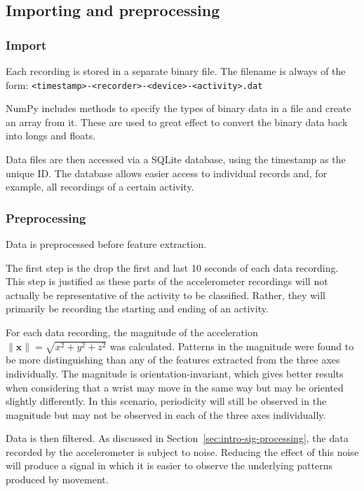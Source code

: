     \subsection{Importing and preprocessing}
      \subsubsection{Import}
        Each recording is stored in a separate binary file. The filename is always of the form: \texttt{<timestamp>-<recorder>-<device>-<activity>.dat}
        
        NumPy includes methods to specify the types of binary data in a file and create an array from it. These are used to great effect to convert the binary data back into longs and floats.
        
        Data files are then accessed via a SQLite database, using the timestamp as the unique ID. The database allows easier access to individual records and, for example, all recordings of a certain activity.
      \subsubsection{Preprocessing}
        \label{sec:preprocessing}
        Data is preprocessed before feature extraction.
        
        The first step is the drop the first and last 10 seconds of each data recording. This step is justified as these parts of the accelerometer recordings will not actually be representative of the activity to be classified. Rather, they will primarily be recording the starting and ending of an activity.
        
        For each data recording, the magnitude of the acceleration $\|\mathbf{x}\| = \sqrt{x^2+y^2+z^2}$ was calculated. Patterns in the magnitude were found to be more distinguishing than any of the features extracted from the three axes individually. The magnitude is orientation-invariant, which gives better results when considering that a wrist may move in the same way but may be oriented slightly differently. In this scenario, periodicity will still be observed in the magnitude but may not be observed in each of the three axes individually.
        
        Data is then filtered. As discussed in Section~\ref{sec:intro-sig-processing}, the data recorded by the accelerometer is subject to noise. Reducing the effect of this noise will produce a signal in which it is easier to observe the underlying patterns produced by movement.
        
